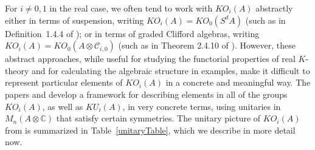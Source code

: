 \documentclass[12pt, reqno]{amsart}
\theoremstyle{definition}
\def\C{{\mathbb C}}
\begin{document}
For $i \neq 0,1$ in the real case, we often tend to work with $KO_i(A)$ abstractly either in terms of suspension, writing $KO_i(A) = KO_0(S^d A)$ (such as in Definition~1.4.4 of \cite{schroderbook}); or in terms of graded Clifford algebras, writing $KO_i(A) = KO_0(A \otimes \mathcal{C}_{i, 0})$ (such as in Theorem 2.4.10 of \cite{schroderbook}). However, these abstract approaches, while useful for studying the functorial properties of real $K$-theory and for calculating the algebraic structure in examples, make it difficult to represent particular elements of $KO_i(A)$ in a concrete and meaningful way. The papers \cite{BL} and \cite{Boer2020} develop a framework for describing elements in all of the groups $KO_i(A)$, as well as $KU_i(A)$, in very concrete terms, using unitaries in $M_n(A \otimes \C)$ that satisfy certain symmetries. The unitary picture of $KO_i(A)$ from \cite{BL} is summarized in Table~\ref{unitaryTable}, which we describe in more detail now.
\end{document}
